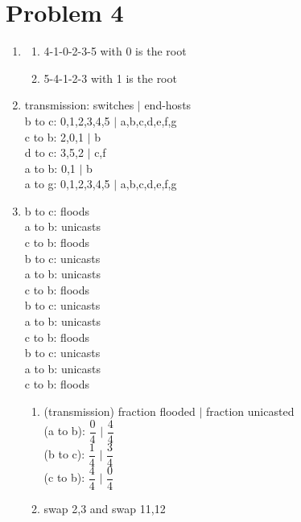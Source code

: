 \documentclass[11pt]{article}
\begin{document}
\section*{Problem 4}
\begin{enumerate}
\item
\begin{enumerate}
\item 4-1-0-2-3-5 with 0 is the root
\item 5-4-1-2-3 with 1 is the root
\end{enumerate}
\item transmission: switches $|$ end-hosts\\
b to c: 0,1,2,3,4,5 $|$ a,b,c,d,e,f,g\\
c to b: 2,0,1 $|$ b\\
d to c: 3,5,2 $|$ c,f\\
a to b: 0,1 $|$ b\\
a to g: 0,1,2,3,4,5 $|$ a,b,c,d,e,f,g
\item
b to c: floods\\
a to b: unicasts\\
c to b: floods\\
b to c: unicasts\\
a to b: unicasts\\
c to b: floods\\
b to c: unicasts\\
a to b: unicasts\\
c to b: floods\\
b to c: unicasts\\
a to b: unicasts\\
c to b: floods
\begin{enumerate}
\item
(transmission) fraction flooded $|$ fraction unicasted\\ 
(a to b): $\dfrac{0}{4}$ $|$ $\dfrac{4}{4}$\\
(b to c): $\dfrac{1}{4}$ $|$ $\dfrac{3}{4}$\\
(c to b): $\dfrac{4}{4}$ $|$ $\dfrac{0}{4}$
\item swap 2,3 and swap 11,12
\end{enumerate}
\end{enumerate}
\label{pg:end-of-p4}
\end{document}
